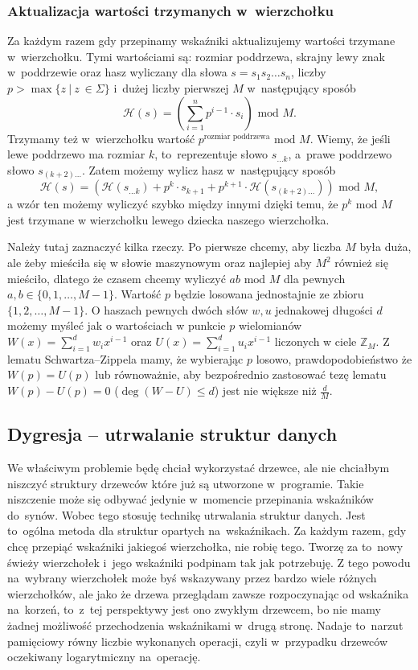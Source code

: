 \documentclass[declaration,shortabstract]{iithesis}
\theoremstyle{definition} \newtheorem{definition}{Definicja}[chapter]
\theoremstyle{plain} \newtheorem{remark}[definition]{Obserwacja}
\theoremstyle{plain} \newtheorem{theorem}[definition]{Twierdzenie}
\theoremstyle{plain} \newtheorem{example}{Przykład}[definition]
\theoremstyle{plain} \newtheorem{lemma}[definition]{Lemat}
\begin{document}
\subsubsection{Aktualizacja wartości trzymanych w~wierzchołku}

Za każdym razem gdy przepinamy wskaźniki aktualizujemy wartości trzymane w~wierzchołku. Tymi wartościami są: rozmiar poddrzewa, skrajny lewy znak w~poddrzewie oraz hasz wyliczany dla słowa $s = s_1 s_2 \ldots s_n$, liczby $p > \max \{ z\ |\ z~\in \Sigma \}$ i~dużej liczby pierwszej $M$ w~następujący sposób $$\mathcal{H}(s) = (\sum_{i=1}^n p^{i-1} \cdot s_i) \text{ mod } M.$$ Trzymamy też w~wierzchołku wartość $p^{\text{rozmiar poddrzewa}} \text{ mod } M$. Wiemy, że jeśli lewe poddrzewo ma rozmiar $k$, to~reprezentuje słowo $s_{\ldots k}$, a~prawe poddrzewo słowo $s_{(k + 2) \ldots}$. Zatem możemy wylicz hasz w~następujący sposób $$ \mathcal{H}(s) = (\mathcal{H}(s_{\ldots k}) + p^k \cdot s_{k+1} + p^{k+1} \cdot \mathcal{H}(s_{(k+2) \ldots})) \text{ mod } M,$$ a wzór ten możemy wyliczyć szybko między innymi dzięki temu, że $p^k$ mod $M$ jest trzymane w wierzchołku lewego dziecka naszego wierzchołka.

Należy tutaj zaznaczyć kilka rzeczy. Po pierwsze chcemy, aby liczba $M$ była duża, ale żeby mieściła się w słowie maszynowym oraz najlepiej aby $M^2$ również się mieściło, dlatego że czasem chcemy wyliczyć $ab \text{ mod } M$ dla pewnych $a, b \in \{0, 1, \ldots, M - 1\}$. Wartość $p$ będzie losowana jednostajnie ze zbioru $\{1, 2, \ldots, M - 1\}$. O haszach pewnych dwóch słów $w, u$ jednakowej długości $d$ możemy myśleć jak o wartościach w punkcie $p$ wielomianów $W(x) = \sum_{i=1}^d w_i x^{i-1}$ oraz $U(x) = \sum_{i=1}^d u_i x^{i-1}$ liczonych w ciele $\mathbb{Z}_M$. Z lematu Schwartza–Zippela \cite{schwartz} mamy, że wybierając $p$ losowo, prawdopodobieństwo że $W(p) = U(p)$ lub równoważnie, aby bezpośrednio zastosować tezę lematu $W(p) - U(p) = 0$ ($\deg(W - U) \leq d$) jest nie większe niż $\frac{d}{M}$.

\subsection{Dygresja -- utrwalanie struktur danych}

We właściwym problemie będę chciał wykorzystać drzewce, ale nie chciałbym niszczyć struktury drzewców które już są utworzone w~programie. Takie niszczenie może się odbywać jedynie w~momencie przepinania wskaźników do~synów. Wobec tego stosuję technikę utrwalania struktur danych. Jest to~ogólna metoda dla struktur opartych na~wskaźnikach. Za każdym razem, gdy chcę przepiąć wskaźniki jakiegoś wierzchołka, nie robię tego. Tworzę za to~nowy świeży wierzchołek i~jego wskaźniki podpinam tak jak potrzebuję. Z tego powodu na~wybrany wierzchołek może byś wskazywany przez bardzo wiele różnych wierzchołków, ale jako że drzewa przeglądam zawsze rozpoczynając od wskaźnika na~korzeń, to~z~tej perspektywy jest ono zwykłym drzewcem, bo nie mamy żadnej możliwość przechodzenia wskaźnikami w~drugą stronę. Nadaje to~narzut pamięciowy równy liczbie wykonanych operacji, czyli w~przypadku drzewców oczekiwany logarytmiczny na~operację.
\end{document}
